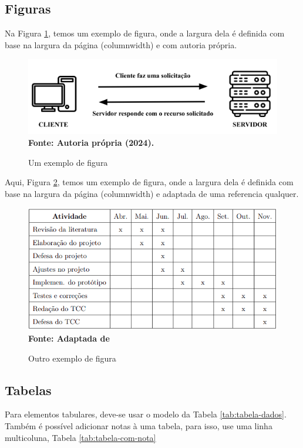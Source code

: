 \subsection{Figuras}
Na Figura \ref{fig:label-uma-figura}, temos um exemplo de figura, onde a largura dela é definida com base na largura da página (columnwidth) e com autoria própria.

\begin{figure}[htb]
	\centering
	\caption{Um exemplo de figura}
	\includegraphics[width = 0.8\columnwidth]{../Images/cliente-servidor.png} 
	\newline \footnotesize \textbf{Fonte: Autoria própria (2024).}
	\label{fig:label-uma-figura}
\end{figure}

Aqui, Figura \ref{fig:outra-figura}, temos um exemplo de figura, onde a largura dela é definida com base na largura da página (columnwidth) e adaptada de uma referencia qualquer.

\begin{figure}[htb]
	\centering
	\caption{Outro exemplo de figura}
	\includegraphics[width = \columnwidth]{../Images/cronograma.png} 
	\newline \footnotesize \textbf{Fonte: Adaptada de \textcite{Pressman2011, Capes2018}}
	\label{fig:outra-figura}
\end{figure}

\subsection{Tabelas}
Para elementos tabulares, deve-se usar o modelo da Tabela \ref{tab:tabela-dados}. Também é possível adicionar notas à uma tabela, para isso, use uma linha multicoluna, Tabela \ref{tab:tabela-com-nota}


